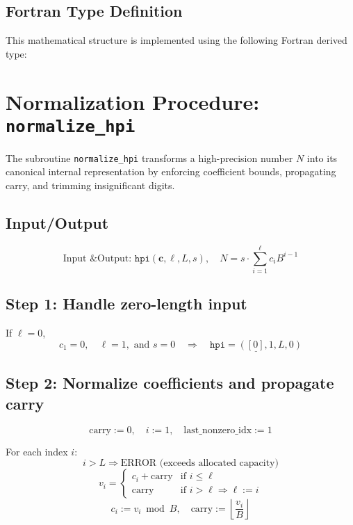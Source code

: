 \documentclass[11pt]{article}
\begin{document}
	\subsection*{Fortran Type Definition}

	This mathematical structure is implemented using the following Fortran derived type:
	
	
	\newpage
	
	\section{Normalization Procedure: \texttt{normalize\_hpi}}
	
	The subroutine \texttt{normalize\_hpi} transforms a high-precision number \( N \) into its canonical internal representation by enforcing coefficient bounds, propagating carry, and trimming insignificant digits.
	
	\subsection*{Input/Output}
	  
	  \[
	  \text{Input \& Output: } \texttt{hpi}(\mathbf{c}, \ell, L, s),\quad N = s \cdot \sum_{i=1}^\ell c_i B^{i-1}
	  \]
	
	
		
	\subsection*{Step 1: Handle zero-length input}
	If \( \ell = 0 \),  
	\[ c_1 = 0,\quad \ell = 1, \text{ and }  s = 0\quad \Rightarrow\quad \underline{\texttt{hpi} = ([0], 1, L, 0)} \]
	
	
	\subsection*{Step 2: Normalize coefficients and propagate carry}
	\[ \text{carry} := 0, \quad i := 1, \quad \text{last\_nonzero\_idx} := 1 \]
	
	For each index \( i \):
	 \[  i > L \Rightarrow \text{ERROR (exceeds allocated capacity)} \]
	\[ v_i = \begin{cases} c_i + \text{carry} &\text{if } i \leq \ell \\ \text{carry} &\text{if } i > \ell \Rightarrow \ell := i \end{cases} \]
	\[ c_i := v_i \bmod B, \quad \text{carry} := \left\lfloor \frac{v_i}{B} \right\rfloor \]
	
	
\end{document}
